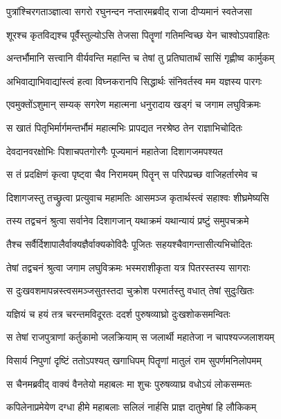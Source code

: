 
\twolineshloka
{पुत्रांश्चिरगताञ्ज्ञात्वा सगरो रघुनन्दन}
{नप्तारमब्रवीद् राजा दीप्यमानं स्वतेजसा} %

\twolineshloka
{शूरश्च कृतविद्यश्च पूर्वैस्तुल्योऽसि तेजसा}
{पितॄणां गतिमन्विच्छ येन चाश्वोऽपवाहितः} %

\twolineshloka
{अन्तर्भौमानि सत्त्वानि वीर्यवन्ति महान्ति च}
{तेषां तु प्रतिघातार्थं सासिं गृह्णीष्व कार्मुकम्} %

\twolineshloka
{अभिवाद्याभिवाद्यांस्त्वं हत्वा विघ्नकरानपि}
{सिद्धार्थः संनिवर्तस्व मम यज्ञस्य पारगः} %

\twolineshloka
{एवमुक्तोंऽशुमान् सम्यक् सगरेण महात्मना}
{धनुरादाय खड्गं च जगाम लघुविक्रमः} %

\twolineshloka
{स खातं पितृभिर्मार्गमन्तर्भौमं महात्मभिः}
{प्रापद्यत नरश्रेष्ठ तेन राज्ञाभिचोदितः} %

\twolineshloka
{देवदानवरक्षोभिः पिशाचपतगोरगैः}
{पूज्यमानं महातेजा दिशागजमपश्यत} %

\twolineshloka
{स तं प्रदक्षिणं कृत्वा पृष्ट्वा चैव निरामयम्}
{पितॄन् स परिपप्रच्छ वाजिहर्तारमेव च} %

\twolineshloka
{दिशागजस्तु तच्छ्रुत्वा प्रत्युवाच महामतिः}
{आसमञ्ज कृतार्थस्त्वं सहाश्वः शीघ्रमेष्यसि} %

\twolineshloka
{तस्य तद्वचनं श्रुत्वा सर्वानेव दिशागजान्}
{यथाक्रमं यथान्यायं प्रष्टुं समुपचक्रमे} %

\twolineshloka
{तैश्च सर्वैर्दिशापालैर्वाक्यज्ञैर्वाक्यकोविदैः}
{पूजितः सहयश्चैवागन्तासीत्यभिचोदितः} %

\twolineshloka
{तेषां तद्वचनं श्रुत्वा जगाम लघुविक्रमः}
{भस्मराशीकृता यत्र पितरस्तस्य सागराः} %

\twolineshloka
{स दुःखवशमापन्नस्त्वसमञ्जसुतस्तदा}
{चुक्रोश परमार्तस्तु वधात् तेषां सुदुःखितः} %

\twolineshloka
{यज्ञियं च हयं तत्र चरन्तमविदूरतः}
{ददर्श पुरुषव्याघ्रो दुःखशोकसमन्वितः} %

\twolineshloka
{स तेषां राजपुत्राणां कर्तुकामो जलक्रियाम्}
{स जलार्थी महातेजा न चापश्यज्जलाशयम्} %

\twolineshloka
{विसार्य निपुणां दृष्टिं ततोऽपश्यत् खगाधिपम्}
{पितॄणां मातुलं राम सुपर्णमनिलोपमम्} %

\twolineshloka
{स चैनमब्रवीद् वाक्यं वैनतेयो महाबलः}
{मा शुचः पुरुषव्याघ्र वधोऽयं लोकसम्मतः} %

\twolineshloka
{कपिलेनाप्रमेयेण दग्धा हीमे महाबलाः}
{सलिलं नार्हसि प्राज्ञ दातुमेषां हि लौकिकम्} %

